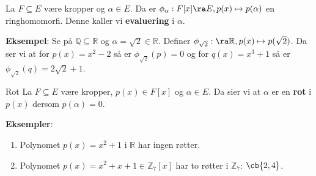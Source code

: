 \begin{theorem*}{22.4}{}
  La $F\subseteq E$ være kropper og $\alpha\in E$. Da er  
  $\phi_\alpha : F[x] \ra E, p(x)\mapsto p(\alpha)$ en ringhomomorfi. Denne kaller vi 
  \textbf{evaluering} i $\alpha$.  
\end{theorem*}

\textbf{Eksempel}: Se på $\mathbb{Q}\subseteq \mathbb{R}$ og $\alpha=\sqrt{2}\in \mathbb{R}$.
Definer $\phi_{\sqrt{2}} : \ra \mathbb{R}, p(x) \mapsto p(\sqrt{2})$. Da ser vi at for 
$p(x)=x^2-2$ så er $\phi_{\sqrt{2}}(p)=0$ og for $q(x)=x^3+1$ så er 
$\phi_{\sqrt{2}}(q)=2\sqrt{2}+1$.

\begin{definition}{Rot}{}
  La $F\subseteq E$ være kropper, $p(x)\in F[x]$ og $\alpha\in E$. Da sier vi at $\alpha$ er en
  \textbf{rot} i $p(x)$ dersom $p(\alpha)=0$.
\end{definition}

\textbf{Eksempler}:
\begin{enumerate}
  \item Polynomet $p(x)=x^2+1$ i $\mathbb{R}$ har ingen røtter.
  \item Polynomet $p(x)=x^2+x+1\in \mathbb{Z}_7[x]$ har to røtter i $\mathbb{Z}_7$: $\cb{2,4}$.
\end{enumerate}
